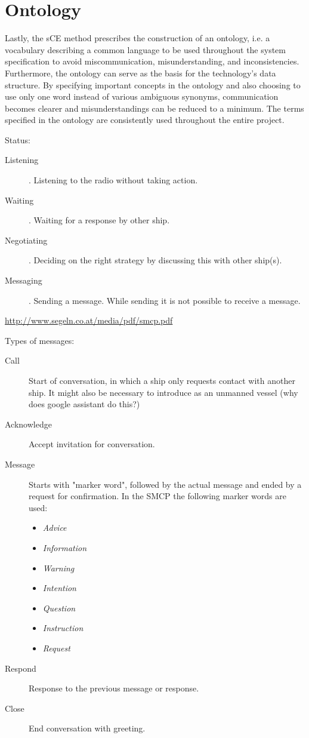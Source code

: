 \section{Ontology}
Lastly, the sCE method prescribes the construction of an ontology, i.e. a vocabulary describing a common language to be used throughout the system specification to avoid miscommunication, misunderstanding, and inconsistencies. Furthermore, the ontology can serve as the basis for the technology’s data structure. By specifying important concepts in the ontology and also choosing to use only one word instead of various ambiguous synonyms, communication becomes clearer and misunderstandings can be reduced to a minimum. The terms specified in the ontology are consistently used throughout the entire project.

Status:
\begin{description}
	\item [Listening]. Listening to the radio without taking action.
	\item [Waiting]. Waiting for a response by other ship.
	\item [Negotiating]. Deciding on the right strategy by discussing this with other ship(s).
	\item [Messaging]. Sending a message. While sending it is not possible to receive a message.
\end{description}

\url{http://www.segeln.co.at/media/pdf/smcp.pdf}

Types of messages:
\begin{description}
	\item [Call] Start of conversation, in which a ship only requests contact with another ship. It might also be necessary to introduce as an unmanned vessel (why does google assistant do this?)
	\item [Acknowledge] Accept invitation for conversation.
	\item [Message] Starts with "marker word", followed by the actual message and ended by a request for confirmation. In the \ac{SMCP} the following marker words are used:
	\begin{itemize}
		\item \emph{Advice}
		\item \emph{Information}
		\item \emph{Warning}
		\item \emph{Intention}
		\item \emph{Question}
		\item \emph{Instruction}
		\item \emph{Request}
	\end{itemize}
	\item [Respond] Response to the previous message or response.
	\item [Close] End conversation with greeting.
\end{description}

